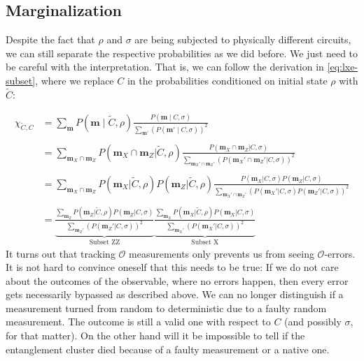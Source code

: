 \subsection{Marginalization}
\label{sec:lxe-err-subset}
Despite the fact that $\rho$ and $\sigma$ are being subjected to physically
different circuits, we can still separate the respective probabilities as we
did before. We just need to be careful with the interpretation. That is, we can
follow the derivation in \cref{eq:lxe-subset}, where we replace $C$ in the
probabilities conditioned on initial state $\rho$ with $\tilde{C}$:

\begin{align}
      \label{eq:lxe-subset-err}
      \chi_{\tilde{C},C} &= \sum_{\mathbf{m}} P(\mathbf{m} \mid \tilde{C}, \rho) \frac{P(\mathbf{m} \mid
      C, \sigma)}{\sum_{\mathbf{m}'}\left(P(\mathbf{m}' \mid
      C, \sigma)\right)^2} \nonumber\\
      \nonumber\\
      &= \sum_{\mathbf{m}_X \cap \mathbf{m}_Z} P(\mathbf{m}_X \cap \mathbf{m}_Z |
        \tilde{C}, \rho) \frac{P(\mathbf{m}_X \cap \mathbf{m}_Z| C,
        \sigma)}{\sum_{\mathbf{m}_X' \cap \mathbf{m}_Z'} \left(P(\mathbf{m}_X' \cap
        \mathbf{m}_Z'|C,\sigma)\right)^2}\nonumber\\
        \nonumber\\
      &= \sum_{\mathbf{m}_X \cap \mathbf{m}_Z} P(\mathbf{m}_X | \tilde{C}, \rho) P(
        \mathbf{m}_Z | \tilde{C}, \rho) \frac{P(\mathbf{m}_X | C, \sigma) P( \mathbf{m}_Z|
        C, \sigma)}{\sum_{\mathbf{m}_X' \cap \mathbf{m}_Z'}
          \left(P(\mathbf{m}_X' | C,
        \sigma) P( \mathbf{m}_Z'|C,\sigma)\right)^2}\nonumber\\
        \nonumber\\
      &= \underbrace{\frac{\sum_{\mathbf{m}_Z} P(\mathbf{m}_Z | \tilde{C}, \rho)
          P(\mathbf{m}_Z | C, \sigma)}{\sum_{\mathbf{m}_Z'}
          \left(P(\mathbf{m}_Z' |
          C, \sigma)\right)^2}}_{\text{Subset ZZ}}
          \underbrace{\frac{\sum_{\mathbf{m}_X} P(\mathbf{m}_X | \tilde{C}, \rho)
          P(\mathbf{m}_X | C, \sigma)}{\sum_{\mathbf{m}_X'}
          \left(P(\mathbf{m}_X' |
          C, \sigma)\right)^2}}_{\text{Subset X}}
\end{align}
It turns out that tracking $\mathcal{O}$ measurements only prevents us from
seeing $\mathcal{O}$-errors. It is not hard to convince oneself that this needs to
be true: If we do not care about the outcomes of the observable, where no errors
happen, then every error gets necessarily bypassed as described above. We can
no longer distinguish if a measurement turned from random to deterministic due
to a faulty random measurement. The outcome is still a valid one with respect to
$C$ (and possibly $\sigma$, for that matter). On the other hand will it be
impossible to tell if the entanglement cluster died because of a faulty
measurement or a native one. 


